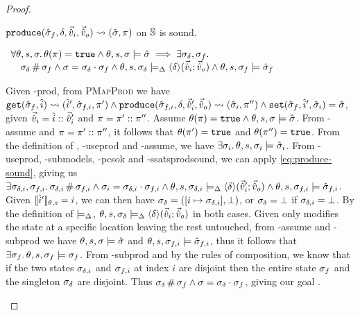 \begin{proof}

\pfassume \begin{hypvlist}
 $\texttt{produce}(\hat{\sigma}_f,\delta,\vec{\hat{v}}_i,\vec{\hat{v}}_o)\rightsquigarrow (\hat{\sigma}, \pi)$
 \produce{} on $\mathbb S$ is sound.
\end{hypvlist}
\pfprove \begin{goalvlist}
 $\begin{array}{l}
\forall\theta,s,\sigma\ldotp \theta(\pi)=\texttt{true} \land \theta,s,\sigma\models\hat{\sigma} \implies \exists \sigma_\delta, \sigma_f\ldotp \\
\quad \sigma_\delta\operatorname{\#}\sigma_f \land \sigma=\sigma_\delta\cdot\sigma_f \land \theta,s,\sigma_\delta \models_{\Delta} \left<\delta\right>\!(\vec{\hat{v}}_i;\vec{\hat{v}}_o) \land \theta,s,\sigma_f \models \hat{\sigma}_f
\end{array}$
\end{goalvlist}

\pfcase{$\delta \in \preds_\mmdl$}

\begin{hypvlist}
 Given \hyp{prod}, from \textsc{PMapProd} we have $\texttt{get}(\hat{\sigma}_f,\hat{i})\rightsquigarrow(\hat{i}',\hat{\sigma}_{f,i},\pi') \land \texttt{produce}(\hat{\sigma}_{f,i},\delta,\vec{\hat{v}}_i',\vec{\hat{v}}_o)\rightsquigarrow (\hat{\sigma}_i,\pi'') \land \texttt{set}(\hat{\sigma}_f,\hat{i}',\hat{\sigma}_i)=\hat{\sigma}$, given $\vec{\hat{v}}_i=\hat{i}::\vec{\hat{v}}_i'$ and $\pi=\pi'::\pi''$.
 Assume $\theta(\pi)=\texttt{true} \land \theta,s,\sigma\models\hat{\sigma}$.
 From \hyp{assume} and $\pi=\pi'::\pi''$, it follows that $\theta(\pi')=\texttt{true}$ and $\theta(\pi'')=\texttt{true}$.
 From the definition of , \hyp{useprod} and \hyp{assume}, we have $\exists \sigma_i\ldotp \theta,s,\sigma_i\models \hat{\sigma}_i$.
 From \hyp{useprod}, \hyp{submodels}, \hyp{pcsok} and \hyp{ssatsprodsound}, we can apply \ref{eq:produce-sound}, giving us $\exists \sigma_{\delta,i}, \sigma_{f,i}\ldotp \sigma_{\delta,i}\operatorname{\#}\sigma_{f,i} \land \sigma_i=\sigma_{\delta,i}\cdot\sigma_{f,i} \land \theta,s,\sigma_{\delta,i}\models_{\Delta} \left<\delta\right>\!(\vec{\hat{v}}_i';\vec{\hat{v}}_o) \land \theta,s,\sigma_{f,i}\models\hat{\sigma}_{f,i}$.
 Given $\llbracket\hat{i}'\rrbracket_{\theta,s}=i$, we can then have $\sigma_\delta=([i\mapsto \sigma_{\delta,i}], \bot)$, or $\sigma_\delta=\bot$ if $\sigma_{\delta,i}=\bot$. By the definition of $\models_{\Delta}$, $\theta,s,\sigma_\delta\models_{\Delta}\left<\delta\right>\!(\vec{\hat{v}}_i;\vec{\hat{v}}_o)$ in both cases.
 Given  only modifies the state at a specific location leaving the rest untouched, from \hyp{assume} and \hyp{subprod} we have $\theta,s,\sigma\models\hat{\sigma}$ and $\theta,s,\sigma_{f,i}\models\hat{\sigma}_{f,i}$, thus it follows that $\exists \sigma_f\ldotp \theta,s,\sigma_f\models\sigma_f$.
 From \hyp{subprod} and by the rules of composition, we know that if the two states $\sigma_{\delta,i}$ and $\sigma_{f,i}$ at index $i$ are disjoint then the entire state $\sigma_f$ and the singleton $\sigma_\delta$ are disjoint. Thus $\sigma_\delta\operatorname{\#}\sigma_f\land\sigma=\sigma_\delta\cdot\sigma_f$, giving our goal .
\end{hypvlist}


\end{proof}
